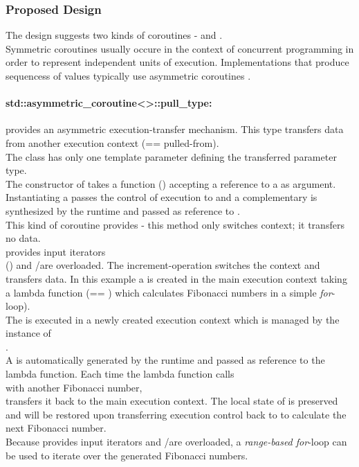 
\subsubsection*{Proposed Design}
The design suggests two kinds of coroutines - \acoro and \scoro.\\
Symmetric coroutines usually occure in the context of concurrent programming in
order to represent independent units of execution. Implementations that produce
sequencess of values typically use asymmetric coroutines \cite{Moura2009}.

\paragraph*{std::asymmetric\_coroutine<>::pull\_type:}
provides an asymmetric execution-transfer mechanism. This type transfers data
from another execution context (== pulled-from).\\
The class has only one template parameter defining the transferred parameter
type.\\
The constructor of \pullcoro takes a function (\corofunction) accepting a
reference to a \pushcoro as argument.\\
Instantiating a \pullcoro passes the control of execution to \corofunction and a
complementary \pushcoro is synthesized by the runtime and passed as reference to
\corofunction.\\
\newline
This kind of coroutine provides \pullcoroop - this method only switches context;
it transfers no data.\\
\newline
\pullcoro provides input iterators\\
(\pullcoroiterator) and \bgin/\ed are overloaded. The increment-operation
switches the context and transfers data.
In this example a \pullcoro is created in the main execution context taking a
lambda function (== \corofunction) which calculates Fibonacci numbers in a
simple \textit{for}-loop).\\
The \corofunction is executed in a newly created execution context which is
managed by the instance of\\
\pullcoro.\\
A \pushcoro is automatically generated by the runtime and passed as reference
to the lambda function. Each time the lambda function calls\\
\pushcoroop with another Fibonacci number,\\
\pushcoro transfers it back to the main execution context. The local state of
\corofunction is preserved and will be restored upon transferring execution
control back to \corofunction to calculate the next Fibonacci number.\\
Because \pullcoro provides input iterators and \bgin/\ed are overloaded, a
\textit{range-based for}-loop can be used to iterate over the generated
Fibonacci numbers.

